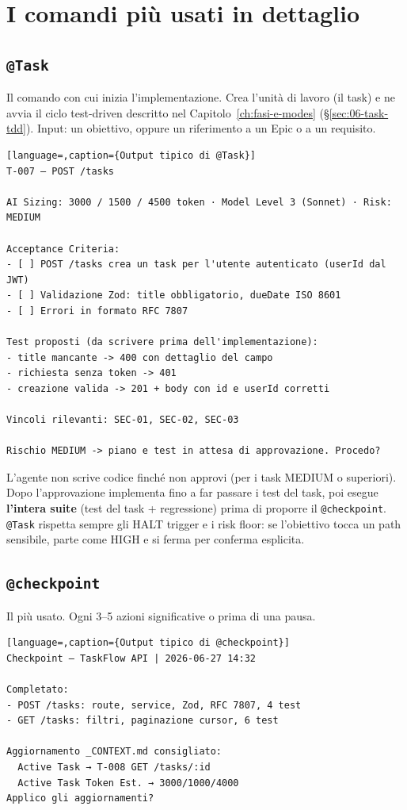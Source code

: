 \section{I comandi più usati in dettaglio}
\label{sec:13-dettaglio}

\subsection*{\texttt{@Task}}

Il comando con cui inizia l'implementazione. Crea l'unità di lavoro (il task) e ne avvia il ciclo test-driven descritto nel Capitolo~\ref{ch:fasi-e-modes} (§\ref{sec:06-task-tdd}). Input: un obiettivo, oppure un riferimento a un Epic o a un requisito.

\begin{lstlisting}[language=,caption={Output tipico di @Task}]
T-007 — POST /tasks

AI Sizing: 3000 / 1500 / 4500 token · Model Level 3 (Sonnet) · Risk: MEDIUM

Acceptance Criteria:
- [ ] POST /tasks crea un task per l'utente autenticato (userId dal JWT)
- [ ] Validazione Zod: title obbligatorio, dueDate ISO 8601
- [ ] Errori in formato RFC 7807

Test proposti (da scrivere prima dell'implementazione):
- title mancante -> 400 con dettaglio del campo
- richiesta senza token -> 401
- creazione valida -> 201 + body con id e userId corretti

Vincoli rilevanti: SEC-01, SEC-02, SEC-03

Rischio MEDIUM -> piano e test in attesa di approvazione. Procedo?
\end{lstlisting}

L'agente non scrive codice finché non approvi (per i task MEDIUM o superiori). Dopo l'approvazione implementa fino a far passare i test del task, poi esegue \textbf{l'intera suite} (test del task + regressione) prima di proporre il \texttt{@checkpoint}. \texttt{@Task} rispetta sempre gli HALT trigger e i risk floor: se l'obiettivo tocca un path sensibile, parte come HIGH e si ferma per conferma esplicita.

\subsection*{\texttt{@checkpoint}}

Il più usato. Ogni 3--5 azioni significative o prima di una pausa.

\begin{lstlisting}[language=,caption={Output tipico di @checkpoint}]
Checkpoint — TaskFlow API | 2026-06-27 14:32

Completato:
- POST /tasks: route, service, Zod, RFC 7807, 4 test
- GET /tasks: filtri, paginazione cursor, 6 test

Aggiornamento _CONTEXT.md consigliato:
  Active Task → T-008 GET /tasks/:id
  Active Task Token Est. → 3000/1000/4000
Applico gli aggiornamenti?
\end{lstlisting}

